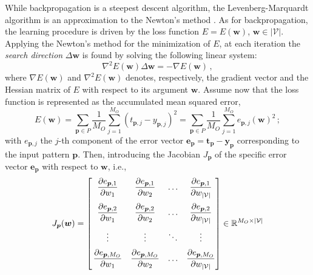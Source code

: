 \documentclass[12pt, a4paper, twoside, openright]{report}
\numberwithin{equation}{chapter}
\theoremstyle{theorem}
\theoremstyle{definition}
\theoremstyle{remark}
\theoremstyle{proposition}
\numberwithin{figure}{chapter}
\begin{document}
		While backpropagation is a steepest descent algorithm, the Levenberg-Marquardt algorithm \cite{Mar63} is an approximation to the Newton's method \cite{Hag94}. As for backpropagation, the learning procedure is driven by the loss function $E = E(\boldsymbol{w})$, $\boldsymbol{w} \in |\mathcal{V}|$. Applying the Newton's method for the minimization of $E$, at each iteration the \emph{search direction} $\Delta \boldsymbol{w}$ is found by solving the following linear system:
		\begin{equation}
			\label{eq:newton}
			\nabla^2 E(\boldsymbol{w}) \Delta \boldsymbol{w} = - \nabla E(\boldsymbol{w}) \, ,
		\end{equation}
		where $\nabla E(\boldsymbol{w})$ and $\nabla^2 E(\boldsymbol{w})$ denotes, respectively, the gradient vector and the Hessian matrix of $E$ with respect to its argument $\boldsymbol{w}$. Assume now that the loss function is represented as the accumulated mean squared error, 
		\begin{equation}
			\label{eq:accumulated-mse-bis}
			E(\boldsymbol{w}) = \sum_{\boldsymbol{p} \in P} \dfrac{1}{M_O} \sum_{j = 1}^{M_O} \left( t_{\boldsymbol{p},j} - y_{\boldsymbol{p},j} \right)^2 = \sum_{\boldsymbol{p} \in P} \dfrac{1}{M_O} \sum_{j = 1}^{M_O} e_{\boldsymbol{p},j}(\boldsymbol{w})^2 \, ;
		\end{equation}
		with $e_{\boldsymbol{p},j}$ the $j$-th component of the error vector $\boldsymbol{e}_{\boldsymbol{p}} = \boldsymbol{t}_{\boldsymbol{p}} - \boldsymbol{y}_{\boldsymbol{p}}$ corresponding to the input pattern $\boldsymbol{p}$. Then, introducing the Jacobian $J_{\boldsymbol{p}}$ of the specific error vector $\boldsymbol{e}_{\boldsymbol{p}}$ with respect to $\boldsymbol{w}$, i.e., 
		\begin{equation}
			\label{eq:jacobian}
			J_{\boldsymbol{p}}(\boldsymbol{w}) = 
			\begin{bmatrix}
				\vspace*{0.2cm}
				\hspace*{-0.3cm} & \dfrac{\partial e_{\boldsymbol{p},1}}{\partial w_1} & \dfrac{\partial e_{\boldsymbol{p},1}}{\partial w_2} & \ldots & \dfrac{\partial e_{\boldsymbol{p},1}}{\partial w_{|\mathcal{V}|}} \\
				\vspace*{0.2cm}
				\hspace*{-0.3cm} & \dfrac{\partial e_{\boldsymbol{p},2}}{\partial w_1} & \dfrac{\partial e_{\boldsymbol{p},2}}{\partial w_2} & \ldots & \dfrac{\partial e_{\boldsymbol{p},2}}{\partial w_{|\mathcal{V}|}} \\
				\vspace*{0.2cm}
				\hspace*{-0.3cm} & \vdots & \vdots & \ddots & \vdots \\
				\hspace*{-0.3cm} & \dfrac{\partial e_{\boldsymbol{p},M_O}}{\partial w_1} & \dfrac{\partial e_{\boldsymbol{p},M_O}}{\partial w_2} & \ldots & \dfrac{\partial e_{\boldsymbol{p},M_O}}{\partial w_{|\mathcal{V}|}}
			\end{bmatrix}
			\in \mathbb{R}^{M_O \times |\mathcal{V}|}
		\end{equation}
\end{document}
